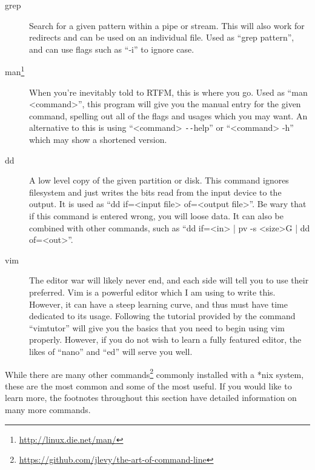 \begin{description}
			\item[grep]
				Search for a given pattern within a pipe or stream.
				This will also work for redirects and can be used on an individual file.
				Used as ``grep pattern'', and can use flags such as ``-i'' to ignore case.
			\item[man\footnote{\url{http://linux.die.net/man/}}]
				When you're inevitably told to RTFM, this is where you go.
				Used as ``man <command>'', this program will give you the manual entry for the given command, spelling out all of the flags and usages which you may want.
				An alternative to this is using ``<command> \verb+--+help'' or ``<command> -h'' which may show a shortened version.
			\item[dd]
				A low level copy of the given partition or disk.
				This command ignores filesystem and just writes the bits read from the input device to the output.
				It is used as ``dd if=<input file> of=<output file>''.
				Be wary that if this command is entered wrong, you will loose data.
				It can also be combined with other commands, such as ``dd if=<in> | pv -s <size>G | dd of=<out>''.
			\item[vim]
				The editor war will likely never end, and each side will tell you to use their preferred.
				Vim is a powerful editor which I am using to write this.
				However, it can have a steep learning curve, and thus must have time dedicated to its usage.
				Following the tutorial provided by the command ``vimtutor'' will give you the basics that you need to begin using vim properly.
				However, if you do not wish to learn a fully featured editor, the likes of ``nano'' and ``ed'' will serve you well.
		\end{description}
		While there are many other commands\footnote{\url{https://github.com/jlevy/the-art-of-command-line}} commonly installed with a \**nix system, these are the most common and some of the most useful. If you would like to learn more, the footnotes throughout this section have detailed information on many more commands.

